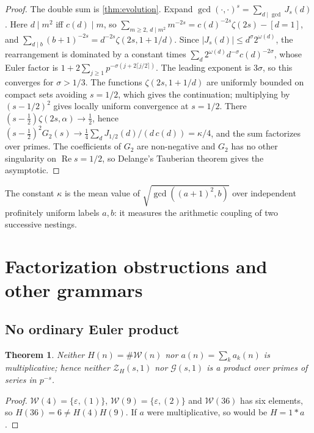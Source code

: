 \documentclass[11pt,a4paper]{article}
\newtheorem{theorem}{Theorem}[section]
\begin{document}
\begin{proof}

The double sum is \cref{thm:evolution}. Expand
\(\gcd(\cdot,\cdot)^s=\sum_{d\mid\gcd}J_s(d)\). Here \(d\mid m^2\) iff
\(c(d)\mid m\), so
\(\sum_{m\ge2,\,d\mid m^2}m^{-2s}=c(d)^{-2s}\zeta(2s)-[d=1]\), and
\(\sum_{d\mid b}(b+1)^{-2s}=d^{-2s}\zeta(2s,1+1/d)\). Since
\(|J_s(d)|\le d^{\sigma}2^{\omega(d)}\), the rearrangement is dominated
by a constant times \(\sum_d2^{\omega(d)}d^{-\sigma}c(d)^{-2\sigma}\),
whose Euler factor is
\(1+2\sum_{j\ge1}p^{-\sigma(j+2\lceil j/2\rceil)}\). The leading
exponent is \(3\sigma\), so this converges for \(\sigma>1/3\). The
functions \(\zeta(2s,1+1/d)\) are uniformly bounded on compact sets
avoiding \(s=1/2\), which gives the continuation; multiplying by
\((s-1/2)^2\) gives locally uniform convergence at \(s=1/2\). There
\((s-\tfrac12)\zeta(2s,\alpha)\to\tfrac12\), hence
\((s-\tfrac12)^2G_2(s)\to\tfrac14\sum_dJ_{1/2}(d)/(d\,c(d))=\kappa/4\),
and the sum factorizes over primes. The coefficients of \(G_2\) are
non-negative and \(G_2\) has no other singularity on
\(\operatorname{Re}s=1/2\), so Delange's Tauberian theorem \cite{delange,tenenbaum} gives the
asymptotic.

\end{proof}

The constant \(\kappa\) is the mean value of \(\sqrt{\gcd((a+1)^2,b)}\)
over independent profinitely uniform labels \(a,b\): it measures the
arithmetic coupling of two successive nestings.

\section{Factorization obstructions and other
grammars}

\subsection{No ordinary Euler product}

\begin{theorem}\label{thm:euler}
Neither \(H(n)=\#\mathcal W(n)\) nor \(a(n)=\sum_ka_k(n)\) is
multiplicative; hence neither \(\mathcal Z_H(s,1)\) nor
\(\mathcal G(s,1)\) is a product over primes of series in \(p^{-s}\).

\end{theorem}

\begin{proof}

\(\mathcal W(4)=\{\varepsilon,(1)\}\),
\(\mathcal W(9)=\{\varepsilon,(2)\}\) and \(\mathcal W(36)\) has six
elements, so \(H(36)=6\ne H(4)H(9)\). If \(a\) were multiplicative, so
would be \(H=1*a\).

\end{proof}
\end{document}
